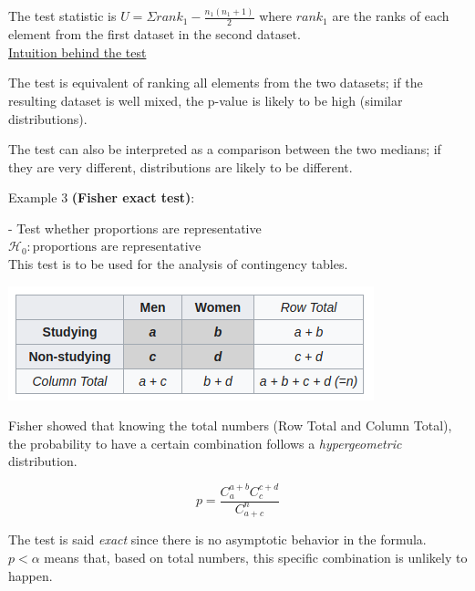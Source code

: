 \vspace{5mm}

The test statistic is $U = \Sigma rank_1 - \frac{n_1(n_1+1)}{2}$ where $rank_1$ are the ranks of each element from the first dataset in the second dataset. \\

\underline{Intuition behind the test}

The test is equivalent of ranking all elements from the two datasets; if the resulting dataset is well mixed, the p-value is likely to be high (similar distributions).

The test can also be interpreted as a comparison between the two medians; if they are very different, distributions are likely to be different.

\vspace{5mm}

Example 3 \textbf{(Fisher exact test)}: 

\vspace{5mm}

- Test whether proportions are representative \\

$\mathcal{H}_0: \text{proportions are representative} $ \\

This test is to be used for the analysis of contingency tables.

\begin{center}
\includegraphics[scale=0.6]{fisher_contingency_table.png}
\end{center}

Fisher showed that knowing the total numbers (Row Total and Column Total), the probability to have a certain combination follows a \textit{hypergeometric} distribution.

$$p = \frac{C_a^{a+b} C_c^{c+d}}{C_{a+c}^n}$$

The test is said \textit{exact} since there is no asymptotic behavior in the formula. \\

$p < \alpha$ means that, based on total numbers, this specific combination is unlikely to happen.

\vspace{5mm}